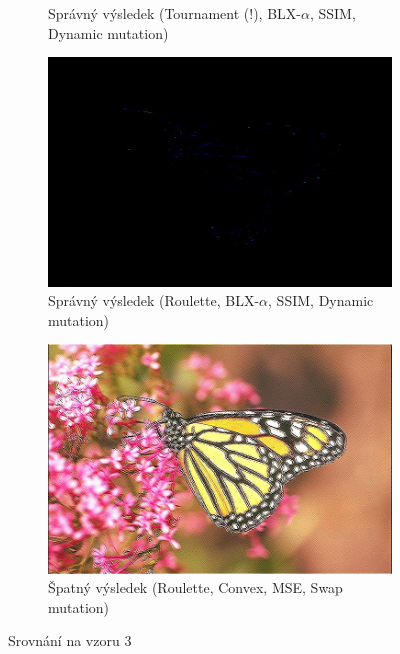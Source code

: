 \documentclass[a4paper,11pt]{scrartcl}
\begin{document}
\begin{figure}[!h]
\begin{subfigure}[b]{0.32\textwidth}
        \caption{Správný výsledek (Tournament (!), BLX-$\alpha$, SSIM, Dynamic mutation)}
        \label{fig:ex31}
    \end{subfigure}
    \begin{subfigure}[b]{0.32\textwidth}
        \includegraphics[width=\textwidth]{img/roulette-blx_a-ssim-dynamic_example3.jpg}
        \caption{Správný výsledek (Roulette, BLX-$\alpha$, SSIM, Dynamic mutation)}
        \label{fig:ex32}
    \end{subfigure}
    \begin{subfigure}[b]{0.32\textwidth}
        \includegraphics[width=\textwidth]{img/roulette-convex-mse-swap_example3.jpg}
        \caption{Špatný výsledek (Roulette, Convex, MSE, Swap mutation)}
        \label{fig:ex33}
    \end{subfigure}
    \caption{Srovnání na vzoru 3}
    \label{porovnani_ex3}
\end{figure}
\end{document}

